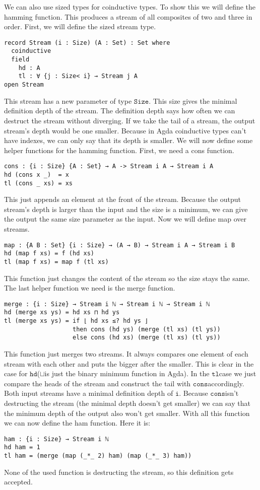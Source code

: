 \documentclass[a4paper,cleardoubleempty,BCOR1cm]{scrbook}
\begin{document}
We can also use sized types for coinductive types.  To show this we will
define the hamming function.  This produces a stream of all composites of two
and three in order.  First, we will define the sized stream type.
\begin{verbatim}
record Stream (i : Size) (A : Set) : Set where
  coinductive
  field
    hd : A
    tl : ∀ {j : Size< i} → Stream j A
open Stream
\end{verbatim}
This stream has a new parameter of type $\mathtt{Size}$. This size gives the minimal
definition depth of the stream. The definition depth says how often we can
destruct the stream without diverging. If we take the tail of a stream, the
output stream's depth would be one smaller. Because in Agda coinductive types
can't have indexes, we can only say that its depth is smaller. We will now
define some helper functions for the hamming function. First, we need a cons
function.
\begin{verbatim}
cons : {i : Size} {A : Set} → A -> Stream i A → Stream i A
hd (cons x _)  = x
tl (cons _ xs) = xs
\end{verbatim}
This just appends an element at the front of the stream.  Because the output
stream's depth is larger than the input and the size is a minimum, we can give
the output the same size parameter as the input.  Now we will define map over
streams.
\begin{verbatim}
map : {A B : Set} {i : Size} → (A → B) → Stream i A → Stream i B
hd (map f xs) = f (hd xs)
tl (map f xs) = map f (tl xs)
\end{verbatim}
This function just changes the content of the stream so the size stays the
same.  The last helper function we need is the merge function.
\begin{verbatim}
merge : {i : Size} → Stream i ℕ → Stream i ℕ → Stream i ℕ
hd (merge xs ys) = hd xs ⊓ hd ys
tl (merge xs ys) = if ⌊ hd xs ≤? hd ys ⌋
                   then cons (hd ys) (merge (tl xs) (tl ys))
                   else cons (hd xs) (merge (tl xs) (tl ys))
\end{verbatim}
This function just merges two streams. It always compares one element of
each stream with each other and puts the bigger after the smaller. This is
clear in the case for $\mathtt{hd}$\;($\mathtt{\sqcup}$\;is just the binary minimum function in
Agda). In the $\mathtt{tl}$\;case we just compare the heads of the stream and construct
the tail with $\mathtt{cons}$\;accordingly. Both input streams have a minimal
definition depth of $\mathtt{i}$. Because $\mathtt{cons}$\;isn't destructing the stream (the
minimal depth doesn't get smaller) we can say that the minimum depth of the
output also won't get smaller. With all this function we can now define the
ham function. Here it is:
\begin{verbatim}
ham : {i : Size} → Stream i ℕ
hd ham = 1
tl ham = (merge (map (_*_ 2) ham) (map (_*_ 3) ham))
\end{verbatim}
None of the used function is destructing the stream, so this definition gets
accepted.
\end{document}
